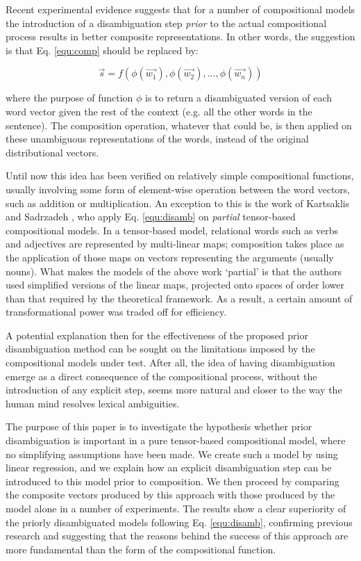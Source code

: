 \documentclass[11pt]{article}
\newcommand{\ov}{\overrightarrow}
\begin{document}
Recent experimental evidence \cite{reddy2011,KartsaklisCONLL,KartsaklisEMNLP} suggests that for a number of compositional models the introduction of a disambiguation step \textit{prior} to the actual compositional process results in better composite representations. In other words, the suggestion is that Eq. \ref{equ:comp} should be replaced by: 

\vspace{-0.65cm}
\begin{equation}
   \ov{s} = f(\phi(\ov{w_1}),\phi(\ov{w_2}),\dots,\phi(\ov{w_n}))
   \label{equ:disamb}
\end{equation}
\vspace{-0.65cm}

\noindent where the purpose of function $\phi$ is to return a disambiguated version of each word vector given the rest of the context (e.g. all the other words in the sentence). The composition operation, whatever that could be, is then applied on these unambiguous representations of the words, instead of the original distributional vectors.

Until now this idea has been verified on relatively simple compositional functions, usually involving some form of element-wise operation between the word vectors, such as addition or multiplication. An exception to this is the work of Kartsaklis and Sadrzadeh , who apply Eq. \ref{equ:disamb} on \textit{partial} tensor-based compositional models. In a tensor-based model, relational words such as verbs and adjectives are represented by multi-linear maps; composition takes place as the application of those maps on vectors representing the arguments (usually nouns). What makes the models of the above work `partial' is that the authors used simplified versions of the linear maps, projected onto spaces of order lower than that required by the theoretical framework. As a result, a certain amount of transformational power was traded off for efficiency.

A potential explanation then for the effectiveness of the proposed prior disambiguation method can be sought on the limitations imposed by the compositional models under test. After all, the idea of having disambiguation emerge as a direct consequence of the compositional process, without the introduction of any explicit step, seems more natural and closer to the way the human mind resolves lexical ambiguities. 

The purpose of this paper is to investigate the hypothesis whether prior disambiguation is important in a pure tensor-based compositional model, where no simplifying assumptions have been made. We create such a model by using linear regression, and we explain how an explicit disambiguation step can be introduced to this model prior to composition. We then proceed by comparing the composite vectors produced by this approach with those produced by the model alone in a number of experiments. The results show a clear superiority of the priorly disambiguated models following Eq. \ref{equ:disamb}, confirming previous research and suggesting that the reasons behind the success of this approach are more fundamental than the form of the compositional function.
\end{document}
